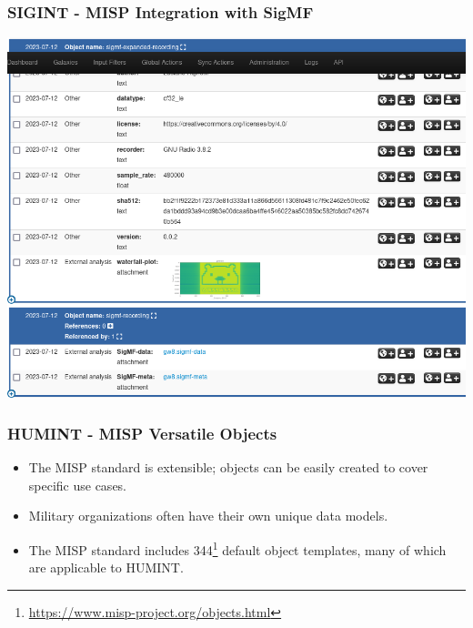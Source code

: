 \begin{frame}
    \frametitle{SIGINT - MISP Integration with SigMF}
\begin{center}
    \includegraphics[scale=0.3]{waterfall.png}
\end{center}
\end{frame}

\begin{frame}
    \frametitle{HUMINT - MISP Versatile Objects}
    \begin{itemize}
        \item The MISP standard is extensible; objects can be easily created to cover specific use cases.
        \item Military organizations often have their own unique data models.
        \item The MISP standard includes 344\footnote{\url{https://www.misp-project.org/objects.html}} default object templates, many of which are applicable to HUMINT.
    \end{itemize}
\end{frame}

